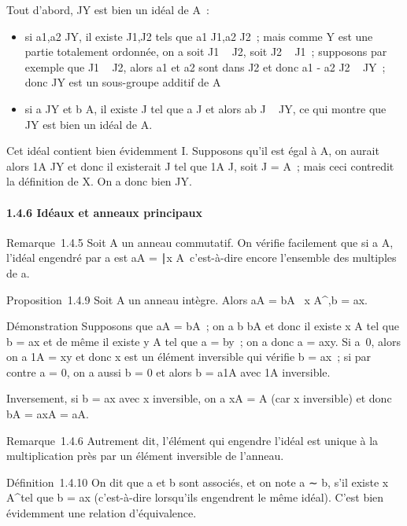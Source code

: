 Tout d'abord, JY est bien un idéal de A~:

\begin{itemize}
\itemsep1pt\parskip0pt
\item
  si a1,a2 \in JY, il existe
  J1,J2 \inY tels que a1 \in
  J1,a2 \in J2~; mais comme Y est une partie
  totalement ordonnée, on a soit J1 \subset~ J2, soit
  J2 \subset~ J1~; supposons par exemple que J1 \subset~
  J2, alors a1 et a2 sont dans
  J2 et donc a1 - a2 \in J2 \subset~
  JY~; donc JY est un sous-groupe additif de A
\item
  si a \in JY et b \in A, il existe J \inY tel que a \in J et alors ab
  \in J \subset~ JY, ce qui montre que JY est bien un idéal
  de A.
\end{itemize}

Cet idéal contient bien évidemment I. Supposons qu'il est égal à A, on
aurait alors 1A \in JY et donc il existerait J \inY tel
que 1A \in J, soit J = A~; mais ceci contredit la définition de
X. On a donc bien JY\inX.

\paragraph{1.4.6 Idéaux et anneaux principaux}

Remarque~1.4.5 Soit A un anneau commutatif. On vérifie facilement que si
a \in A, l'idéal engendré par a est aA =
\ax∣x \in A\
c'est-à-dire encore l'ensemble des multiples de a.

Proposition~1.4.9 Soit A un anneau intègre. Alors aA = bA
\Leftrightarrow \exists~x \in
A^\times,b = ax.

Démonstration Supposons que aA = bA~; on a b \in bA et donc il existe x \in
A tel que b = ax et de même il existe y \in A tel que a = by~; on a donc a
= axy. Si a\neq~0, alors on a 1A = xy
et donc x est un élément inversible qui vérifie b = ax~; si par contre a
= 0, on a aussi b = 0 et alors b = a1A avec 1A
inversible.

Inversement, si b = ax avec x inversible, on a xA = A (car x inversible)
et donc bA = axA = aA.

Remarque~1.4.6 Autrement dit, l'élément qui engendre l'idéal est unique
à la multiplication près par un élément inversible de l'anneau.

Définition~1.4.10 On dit que a et b sont associés, et on note a ∼ b,
s'il existe x \in A^\times tel que b = ax (c'est-à-dire lorsqu'ils
engendrent le même idéal). C'est bien évidemment une relation
d'équivalence.

